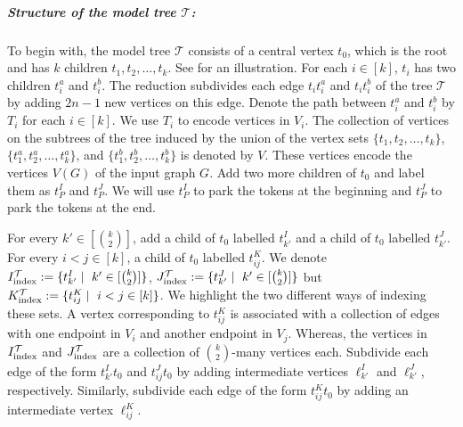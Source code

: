 \subparagraph*{Structure of the model tree $\mathcal{T}$:}
To begin with, the model tree $\mathcal{T}$ consists of
a central vertex $t_0$, which is the root and has
$k$ children $t_1,t_2,\ldots,t_k$.
See  for an illustration.
For each $i\in[k]$, $t_i$ has two children $t_i^a$ and $t_i^b$.
The reduction subdivides each edge $t_it_i^a$ and $t_it_i^b$ of the tree $\mathcal{T}$ by adding $2n-1$ new vertices on this edge.
Denote the path between $t_i^a$ and $t_i^b$ by $T_i$ for each $i \in [k]$.
We use $T_i$ to encode vertices in $V_i$.
The collection of vertices on the subtrees of the tree induced by the union of
the vertex sets $\{t_1,t_2,\ldots,t_k\}$, $\{t^a_1,t^a_2,\ldots,t^a_k\}$,
and $\{t^b_1,t^b_2,\ldots,t^b_k\}$ is denoted by $V$.
These vertices encode the vertices $V(G)$ of the input graph $G$.
Add two more children of $t_0$ and label them as $t_P^I$ and $t_P^J$.
We will use $t_P^I$ to park the tokens at the beginning and
$t_P^J$ to park the tokens at the end.

For every $k' \in [\binom{k}{2}]$, add a child of $t_0$ labelled $t^I_{k'}$
and a child of $t_0$ labelled $t^J_{k'}$.
For every $i < j \in [k]$, a child of $t_0$ labelled $t^K_{ij}$.
{We denote $I^{\mathcal{T} }_{\text{index}} := \{t^I_{k'} \mid\ k' \in [\binom{k}{2}]\} $,
$J^{\mathcal{T}}_{\text{index}} := \{t^J_{k'} \mid\ k' \in [\binom{k}{2}]\}$ but
$K^{\mathcal{T} }_{\text{index}} := \{t^K_{ij} \mid\ i < j \in [k]\}$.}
{We highlight the two different ways of indexing these sets.}
A vertex corresponding to $t^K_{ij}$ is associated with
a collection of edges with one endpoint in $V_i$ and another endpoint
in $V_j$.
Whereas, the vertices in $I^{\mathcal{T} }_{\text{index}}$ and 
$ J^{\mathcal{T}}_{\text{index}}$
are a collection of $\binom{k}{2}$-many vertices each.
Subdivide each edge of the form $t^I_{k'}t_0$ and $t^J_{ij}t_0$
by adding intermediate vertices $\ell^I_{k'}$ and $\ell^J_{k'}$, respectively.
Similarly, subdivide each edge of the form $t^K_{ij}t_0$ by adding an
intermediate vertex $\ell^K_{ij}$.


